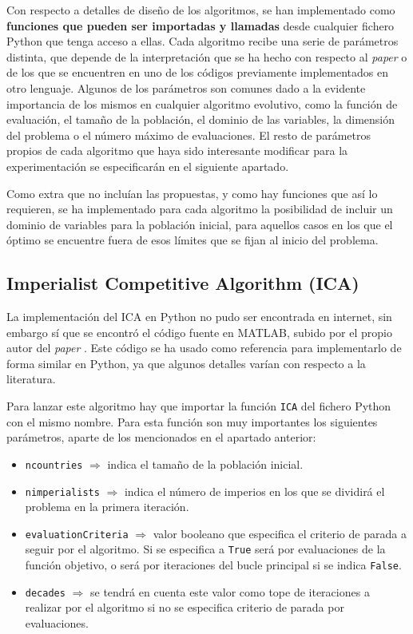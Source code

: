 Con respecto a detalles de diseño de los algoritmos, se han implementado como \textbf{funciones que pueden ser importadas y llamadas} desde cualquier fichero Python que tenga acceso a ellas. Cada algoritmo recibe una serie de parámetros distinta, que depende de la interpretación que se ha hecho con respecto al \textit{paper} o de los que se encuentren en uno de los códigos previamente implementados en otro lenguaje. Algunos de los parámetros son comunes dado a la evidente importancia de los mismos en cualquier algoritmo evolutivo, como la función de evaluación, el tamaño de la población, el dominio de las variables, la dimensión del problema o el número máximo de evaluaciones. El resto de parámetros propios de cada algoritmo que haya sido interesante modificar para la experimentación se especificarán en el siguiente apartado.

Como extra que no incluían las propuestas, y como hay funciones que así lo requieren, se ha implementado para cada algoritmo la posibilidad de incluir un dominio de variables para la población inicial, para aquellos casos en los que el óptimo se encuentre fuera de esos límites que se fijan al inicio del problema.

\subsection{Imperialist Competitive Algorithm (ICA)}

La implementación del ICA en Python no pudo ser encontrada en internet, sin embargo sí que se encontró el código fuente en MATLAB, subido por el propio autor del \textit{paper} \cite{ica-matlab}. Este código se ha usado como referencia para implementarlo de forma similar en Python, ya que algunos detalles varían con respecto a la literatura.

Para lanzar este algoritmo hay que importar la función \texttt{ICA} del fichero Python con el mismo nombre. Para esta función son muy importantes los siguientes parámetros, aparte de los mencionados en el apartado anterior:

\begin{itemize}
	\item \texttt{ncountries} $\Rightarrow$ indica el tamaño de la población inicial.
	\item \texttt{nimperialists} $\Rightarrow$ indica el número de imperios en los que se dividirá el problema en la primera iteración.
	\item \texttt{evaluationCriteria} $\Rightarrow$ valor booleano que especifica el criterio de parada a seguir por el algoritmo. Si se especifica a \texttt{True} será por evaluaciones de la función objetivo, o será por iteraciones del bucle principal si se indica \texttt{False}.
	\item \texttt{decades} $\Rightarrow$ se tendrá en cuenta este valor como tope de iteraciones a realizar por el algoritmo si no se especifica criterio de parada por evaluaciones.
\end{itemize}

